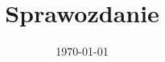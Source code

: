 \documentclass[12pt]{article}
\title{Sprawozdanie}
\date{\today}
\begin{document}
% 



\MyTitlePage






\end{document}
